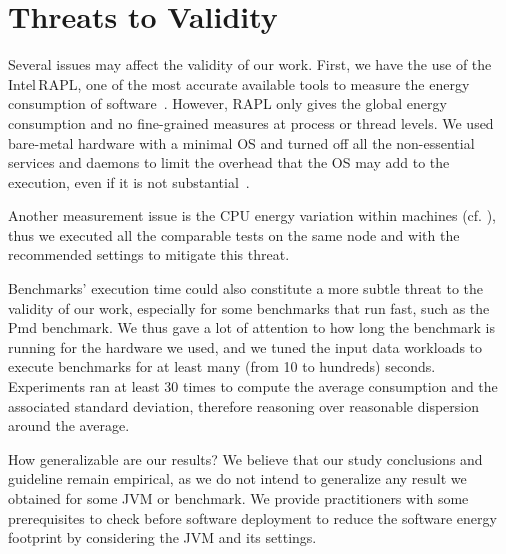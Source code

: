 \section{Threats to Validity}\label{sec:threats}
Several issues may affect the validity of our work.
First, we have the use of the Intel\,RAPL, one of the most accurate available tools to measure the energy consumption of software~\cite{Khan:2018:RAE:3199681.3177754,10.1145/2989081.2989088}.
However, RAPL only gives the global energy consumption and no fine-grained measures at process or thread levels.
We used bare-metal hardware with a minimal OS and turned off all the non-essential services and daemons to limit the overhead that the OS may add to the execution, even if it is not substantial~\cite{opaper}.

Another measurement issue is the CPU energy variation within machines (cf. ), thus we executed all the comparable tests on the same node and with the recommended settings to mitigate this threat.

Benchmarks' execution time could also constitute a more subtle threat to the validity of our work, especially for some benchmarks that run fast, such as the \textsf{Pmd} benchmark.
We thus gave a lot of attention to how long the benchmark is running for the hardware we used, and we tuned the input data workloads to execute benchmarks for at least many (from 10 to hundreds) seconds.
Experiments ran at least 30 times to compute the average consumption and the associated standard deviation, therefore reasoning over reasonable dispersion around the average.

How generalizable are our results?
We believe that our study conclusions and guideline remain empirical, as we do not intend to generalize any result we obtained for some JVM or benchmark.
We provide practitioners with some prerequisites to check before software deployment to reduce the software energy footprint by considering the JVM and its settings.


